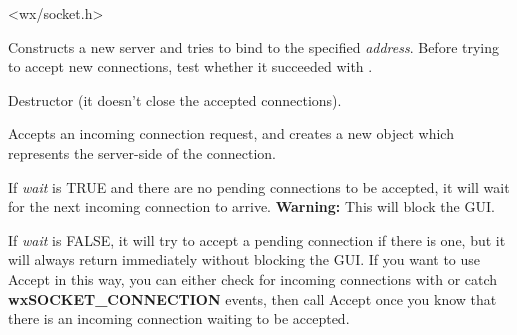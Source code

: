 
<wx/socket.h>


%
%
\label{wxsocketserverconstr}


Constructs a new server and tries to bind to the specified {\it address}.
Before trying to accept new connections, test whether it succeeded with
.




%
%


Destructor (it doesn't close the accepted connections).

%
%
\label{wxsocketserveraccept}


Accepts an incoming connection request, and creates a new
 object which represents
the server-side of the connection.

If {\it wait} is TRUE and there are no pending connections to be
accepted, it will wait for the next incoming connection to arrive.
{\bf Warning:} This will block the GUI.

If {\it wait} is FALSE, it will try to accept a pending connection
if there is one, but it will always return immediately without blocking
the GUI. If you want to use Accept in this way, you can either check for
incoming connections with 
or catch {\bf wxSOCKET\_CONNECTION} events, then call Accept once you know
that there is an incoming connection waiting to be accepted.


